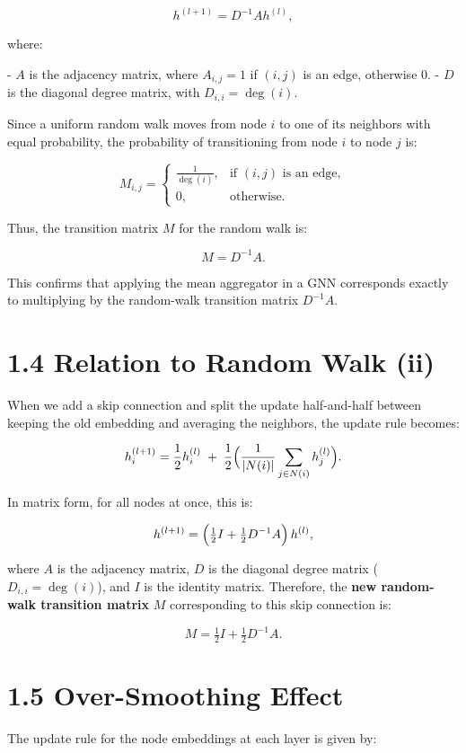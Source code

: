 \documentclass[a4paper,12pt]{article}
\begin{document}
\[
h^{(l+1)} = D^{-1} A h^{(l)},
\]

where:

- \(A\) is the adjacency matrix, where \(A_{i,j} = 1\) if \((i,j)\) is an edge, otherwise \(0\).
- \(D\) is the diagonal degree matrix, with \(D_{i,i} = \deg(i)\).

Since a uniform random walk moves from node \(i\) to one of its neighbors with equal probability, the probability of transitioning from node \(i\) to node \(j\) is:

\[
M_{i,j} =
\begin{cases}
\frac{1}{\deg(i)}, & \text{if } (i,j) \text{ is an edge}, \\[6pt]
0, & \text{otherwise}.
\end{cases}
\]

Thus, the transition matrix \(M\) for the random walk is:

\[
M = D^{-1} A.
\]

This confirms that applying the mean aggregator in a GNN corresponds exactly to multiplying by the random-walk transition matrix \(D^{-1} A\).


\section*{1.4 Relation to Random Walk (ii)}

When we add a skip connection and split the update half-and-half between 
keeping the old embedding and averaging the neighbors, the update rule becomes:

\[
h_{i}^{(l+1)} = \frac{1}{2}h_{i}^{(l)} \;+\;\frac{1}{2}\Bigl(\frac{1}{|N(i)|}\sum_{j\in N(i)} h_{j}^{(l)}\Bigr).
\]

In matrix form, for all nodes at once, this is:

\[
h^{(l+1)} = \Bigl(\tfrac12 I + \tfrac12 D^{-1}A\Bigr)\,h^{(l)},
\]

where \(A\) is the adjacency matrix, \(D\) is the diagonal degree matrix 
(\(D_{i,i} = \deg(i)\)), and \(I\) is the identity matrix. Therefore, 
the \textbf{new random-walk transition matrix} \(M\) corresponding to this 
skip connection is:

\[
M = \tfrac12 I + \tfrac12 D^{-1}A.
\]

\section*{1.5 Over-Smoothing Effect}

The update rule for the node embeddings at each layer is given by:
\end{document}
